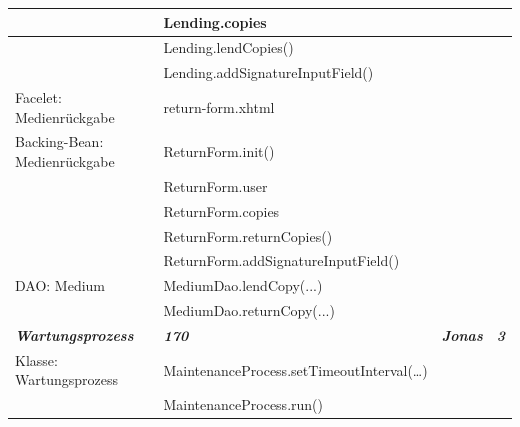 \documentclass{article}
\begin{document}
\begin{longtable}{|l|l|l|l|}
\hline
                                        & Lending.copies                           &                             &                        \\ 
\hline
                                        & Lending.lendCopies()                     &                             &                        \\ 
\hline
                                        & Lending.addSignatureInputField()         &                             &                        \\ 
\hline
Facelet: Medienrückgabe                 & return-form.xhtml                        &                             &                        \\ 
\hline
Backing-Bean: Medienrückgabe            & ReturnForm.init()                        &                             &                        \\ 
\hline
                                        & ReturnForm.user                          &                             &                        \\ 
\hline
                                        & ReturnForm.copies                        &                             &                        \\ 
\hline
                                        & ReturnForm.returnCopies()                &                             &                        \\ 
\hline
                                        & ReturnForm.addSignatureInputField()      &                             &                        \\ 
\hline
DAO: Medium                             & MediumDao.lendCopy(...)                  &                             &                        \\ 
\hline
                                        & MediumDao.returnCopy(...)                &                             &                        \\ 
\hline
\textbf{\textit{Wartungsprozess}}       & \textbf{\textit{170}}                    & \textbf{\textit{Jonas}}     & \textbf{\textit{3}}    \\ 
\hline
Klasse: Wartungsprozess                 & MaintenanceProcess.setTimeoutInterval(…) &                             &                        \\ 
\hline
                                        & MaintenanceProcess.run()                 &                             &                        \\ 

\end{longtable}
\end{document}
